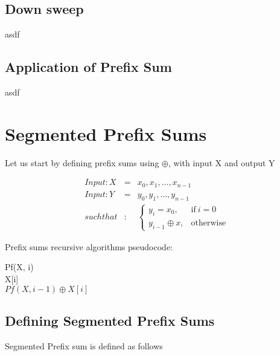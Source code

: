 \documentclass[11pt]{article}
\begin{document}
\subsection{Down sweep}

asdf

\subsection{Application of Prefix Sum}

asdf

\section{Segmented Prefix Sums}

Let us start by defining prefix sums using $\oplus$, with input X and output Y

  \begin{eqnarray*}
    Input: X &=& {x_0, x_1, \dots , x_{n-1}}\\
    Input: Y &=& {y_0, y_1, \dots , y_{n-1}}\\
    such that&:&
    \begin{cases}
      y_i = x_0, & \text{if}\ i = 0 \\
      y_{i-1} \oplus x, & \text{otherwise}
    \end{cases}
  \end{eqnarray*}

Prefix sums recursive algorithms pseudocode:

\begin{algorithm}
  \begin{algorithmic}[1]
    \State Pf(X, i)
     \\
      \quad\Return X[i]
    \Else \\
      \quad\Return $Pf(X, i - 1) \oplus X[i]$
    \EndIf
  \end{algorithmic}
\end{algorithm}

\subsection{Defining Segmented Prefix Sums}

Segmented Prefix sum is defined as follows
\end{document}
